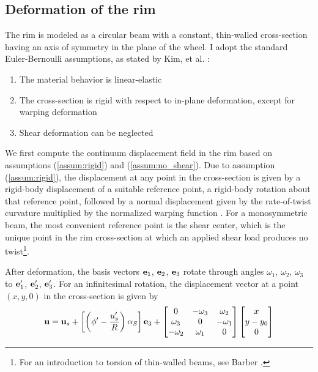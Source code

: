 \documentclass[\rootdir/thesis.tex]{subfiles}
\begin{document}
\subsection{Deformation of the rim}

The rim is modeled as a circular beam with a constant, thin-walled cross-section having an axis of symmetry in the plane of the wheel. I adopt the standard Euler-Bernoulli assumptions, as stated by Kim, et al. \cite{KimMinSuh}:

\begin{enumerate}
	\item{The material behavior is linear-elastic}\label{assum:elastic}
	\item{The cross-section is rigid with respect to in-plane deformation, except for warping deformation}\label{assum:rigid}
	\item{Shear deformation can be neglected}\label{assum:no_shear} 
\end{enumerate}

We first compute the continuum displacement field in the rim based on assumptions (\ref{assum:rigid}) and (\ref{assum:no_shear}). Due to assumption (\ref{assum:rigid}), the displacement at any point in the cross-section is given by a rigid-body displacement of a suitable reference point, a rigid-body rotation about that reference point, followed by a normal displacement given by the rate-of-twist curvature multiplied by the normalized warping function \cite{warping mechanics}. For a monosymmetric beam, the most convenient reference point is the shear center, which is the unique point in the rim cross-section at which an applied shear load produces no twist\footnote{For an introduction to torsion of thin-walled beams, see Barber \cite{Barber}.}.

After deformation, the basis vectors $\mathbf{e}_1$, $\mathbf{e}_2$, $\mathbf{e}_3$ rotate through angles $\omega_1$, $\omega_2$, $\omega_3$ to $\mathbf{e}_1'$, $\mathbf{e}_2'$, $\mathbf{e}_3'$. For an infinitesimal rotation, the displacement vector at a point $(x, y, 0)$ in the cross-section is given by
\begin{equation}
\label{eq:u_t}
\mathbf{u} = \mathbf{u}_s + \left[\left(\phi' - \frac{u_s'}{R}\right)\alpha_S\right]\mathbf{e}_3 +
\begin{bmatrix}
0        & -\omega_3& \omega_2\\
\omega_3 & 0        & -\omega_1\\
-\omega_2& \omega_1 & 0
\end{bmatrix}
\begin{bmatrix}x\\y - y_0\\0\end{bmatrix}
\end{equation}
\end{document}
